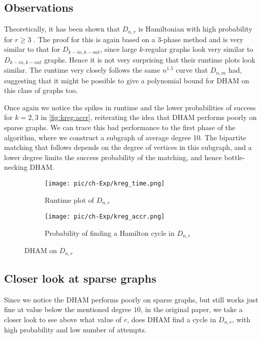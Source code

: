 \subsection{Observations}
Theoretically, it has been shown that $D_{n, r}$ is Hamiltonian with high probability for $r \ge 3$ \cite{cooper:kreg}. The proof for this is again based on a 3-phase method and is very similar to that for $D_{k-in, k-out}$, since large $k$-regular graphs look very similar to $D_{k-in, k-out}$ graphs. Hence it is not very surprising that their runtime plots look similar. The runtime very closely follows the same $n^{1.5}$ curve that $D_{n, m}$ had, suggesting that it might be possible to give a polynomial bound for DHAM on this class of graphs too.

Once again we notice the spikes in runtime and the lower probabilities of success for $k = 2, 3$ in \autoref{fig:kreg:accr}, reiterating the idea that DHAM performs poorly on sparse graphs. We can trace this bad performance to the first phase of the algorithm, where we construct a subgraph of average degree 10. The bipartite matching that follows depends on the degree of vertices in this subgraph, and a lower degree limits the success probability of the matching, and hence bottle-necking DHAM. 

\begin{figure}[ht]

\begin{subfigure}{\textwidth}
\centering
\texttt{[image: pic/ch-Exp/kreg\_time.png]}
\caption{Runtime plot of $D_{n, r}$}
\label{fig:kreg:time}
\end{subfigure}
\begin{subfigure}{\textwidth}
\centering
\texttt{[image: pic/ch-Exp/kreg\_accr.png]}
\caption{Probability of finding a Hamilton cycle in $D_{n, r}$}
\label{fig:kreg:accr}
\end{subfigure}

\caption{DHAM on $D_{n, r}$}
\label{fig:kreg:plots}
\end{figure}
\subsection{Closer look at sparse graphs}
Since we notice the DHAM performs poorly on sparse graphs, but still works just fine at value below the mentioned degree $10$, in the original paper, we take a closer look to see above what value of $r$, does DHAM find a cycle in $D_{n, r}$, with high probability and low number of attempts.

